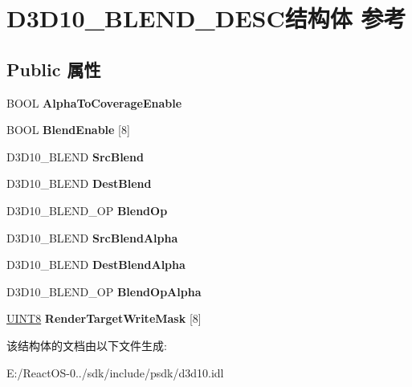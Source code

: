 \hypertarget{struct_d3_d10___b_l_e_n_d___d_e_s_c}{}\section{D3\+D10\+\_\+\+B\+L\+E\+N\+D\+\_\+\+D\+E\+S\+C结构体 参考}
\label{struct_d3_d10___b_l_e_n_d___d_e_s_c}
\subsection*{Public 属性}
\begin{DoxyCompactItemize}
\item 
\mbox{\label{struct_d3_d10___b_l_e_n_d___d_e_s_c_a8690cd6687794444a55e579f3554501d}} 
B\+O\+OL {\bfseries Alpha\+To\+Coverage\+Enable}
\item 
\mbox{\label{struct_d3_d10___b_l_e_n_d___d_e_s_c_a16842c0b4136ec93331804c9efbca6d4}} 
B\+O\+OL {\bfseries Blend\+Enable} \mbox{[}8\mbox{]}
\item 
\mbox{\label{struct_d3_d10___b_l_e_n_d___d_e_s_c_a732d5855ed452c831b81caed7072c61e}} 
D3\+D10\+\_\+\+B\+L\+E\+ND {\bfseries Src\+Blend}
\item 
\mbox{\label{struct_d3_d10___b_l_e_n_d___d_e_s_c_ae7594adca804558fa77d1066844e4879}} 
D3\+D10\+\_\+\+B\+L\+E\+ND {\bfseries Dest\+Blend}
\item 
\mbox{\label{struct_d3_d10___b_l_e_n_d___d_e_s_c_abd07baec6d61844c28adebb28eb9c018}} 
D3\+D10\+\_\+\+B\+L\+E\+N\+D\+\_\+\+OP {\bfseries Blend\+Op}
\item 
\mbox{\label{struct_d3_d10___b_l_e_n_d___d_e_s_c_a358727a9e1514cdd952efc5147b55dc2}} 
D3\+D10\+\_\+\+B\+L\+E\+ND {\bfseries Src\+Blend\+Alpha}
\item 
\mbox{\label{struct_d3_d10___b_l_e_n_d___d_e_s_c_a99686ceebc5d611f7e3994f7d45a9280}} 
D3\+D10\+\_\+\+B\+L\+E\+ND {\bfseries Dest\+Blend\+Alpha}
\item 
\mbox{\label{struct_d3_d10___b_l_e_n_d___d_e_s_c_ad76fb4b0917d4809bc9cfdd5290afae5}} 
D3\+D10\+\_\+\+B\+L\+E\+N\+D\+\_\+\+OP {\bfseries Blend\+Op\+Alpha}
\item 
\mbox{\label{struct_d3_d10___b_l_e_n_d___d_e_s_c_af14e1f4417237de4c427227233c461cd}} 
\hyperlink{_processor_bind_8h_ab27e9918b538ce9d8ca692479b375b6a}{U\+I\+N\+T8} {\bfseries Render\+Target\+Write\+Mask} \mbox{[}8\mbox{]}
\end{DoxyCompactItemize}


该结构体的文档由以下文件生成\+:\begin{DoxyCompactItemize}
\item 
E\+:/\+React\+O\+S-\/0../sdk/include/psdk/d3d10.\+idl\end{DoxyCompactItemize}
